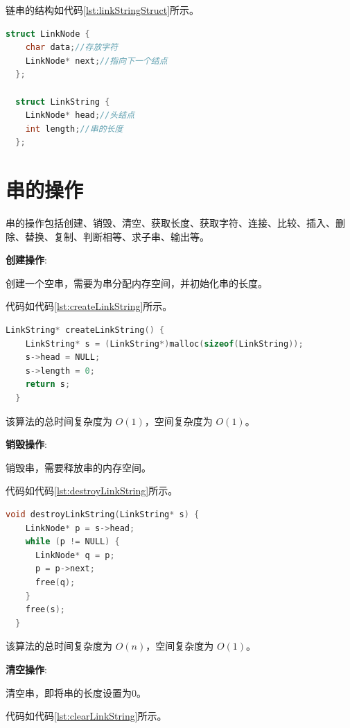\documentclass[lang=cn,newtx,10pt,scheme=chinese]{../elegantbook}
\begin{document}
链串的结构如代码\ref{lst:linkStringStruct}所示。

\begin{lstlisting}[language=C++, caption={链串结构体定义}, label={lst:linkStringStruct}]
  struct LinkNode {
    char data;//存放字符
    LinkNode* next;//指向下一个结点
  };

  struct LinkString {
    LinkNode* head;//头结点
    int length;//串的长度
  };
\end{lstlisting}

\section{串的操作}

串的操作包括创建、销毁、清空、获取长度、获取字符、连接、比较、插入、删除、替换、复制、判断相等、求子串、输出等。

\textbf{创建操作}:

创建一个空串，需要为串分配内存空间，并初始化串的长度。

代码如代码\ref{lst:createLinkString}所示。

\begin{lstlisting}[language=C++, caption={创建一个空串示例代码}, label={lst:createLinkString}]
  LinkString* createLinkString() {
    LinkString* s = (LinkString*)malloc(sizeof(LinkString));
    s->head = NULL;
    s->length = 0;
    return s;
  }

\end{lstlisting}

该算法的总时间复杂度为 $O(1)$，空间复杂度为 $O(1)$。


\textbf{销毁操作}:

销毁串，需要释放串的内存空间。

代码如代码\ref{lst:destroyLinkString}所示。

\begin{lstlisting}[language=C++, caption={销毁串示例代码}, label={lst:destroyLinkString}]
  void destroyLinkString(LinkString* s) {
    LinkNode* p = s->head;
    while (p != NULL) {
      LinkNode* q = p;
      p = p->next;
      free(q);
    }
    free(s);
  }

\end{lstlisting}

该算法的总时间复杂度为 $O(n)$，空间复杂度为 $O(1)$。


\textbf{清空操作}:

清空串，即将串的长度设置为0。

代码如代码\ref{lst:clearLinkString}所示。
\end{document}
